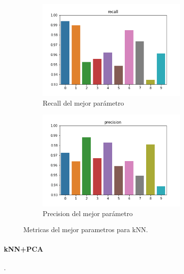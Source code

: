 \begin{figure}[H]
\begin{subfigure}{0.5\textwidth}
\includegraphics[width=0.9\linewidth, height=5cm]{images/recall_knn.png} 
\caption{Recall del mejor parámetro}
\end{subfigure}
\begin{subfigure}{0.5\textwidth}
\includegraphics[width=0.9\linewidth, height=5cm]{images/precision_knn.png} 
\caption{Precision del mejor parámetro}
\end{subfigure}
\caption{Metricas del mejor parametros para kNN.}
\label{knn_metricas}%
\end{figure}





\paragraph{kNN+PCA}.


